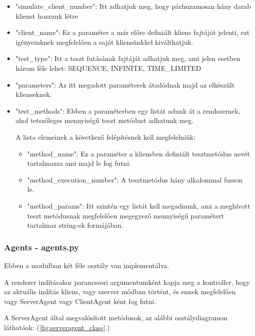 \documentclass[a4paper,12pt,oneside]{report}
\begin{document}
\begin{itemize}
    \itemsep0em
        \item "simulate\_client\_number": Itt adhatjuk meg, hogy párhuzamosan hány darab klienst hozzunk létre
        \item "client\_name": Ez a paraméter a már előre definiált kliens fajtáját jelenti, ezt igényeinknek megfelelően a saját kliensünkkel kiválthatjuk.
        \item "test\_type": Itt a teszt futásának fajtáját adhatjuk meg, ami jelen esetben három féle lehet: SEQUENCE, INFINITE, TIME\_LIMITED
        \item "parameters": Az itt megadott paraméterek átadódnak majd az elkészült klienseknek.
        \item "test\_methods": Ebben a paraméterben egy listát adunk át a rendszernek, ahol tetszőleges mennyiségű teszt metódust adhatunk meg.

        A lista elemeinek a következő felépítésnek kell megfelelniük:
        \begin{itemize}
            \itemsep0em
                \item "method\_name": Ez a paraméter a kliensben definiált tesztmetódus nevét tartalmazza ami majd le fog futni.
                \item "method\_execution\_number": A tesztmetódus hány alkalommal fusson le.
                \item "method\_params": Itt szintén egy listát kell megadnunk, ami a meghívott teszt metódusnak megfelelően megegyező mennyiségű paramétert tartalmaz string-ek formájában.
        \end{itemize}

\end{itemize}

\subsubsection{Agents - agents.py}

Ebben a modulban két féle osztály van implementálva.

A rendszer indításakor parancssori argumentumként kapja meg a kontroller, hogy az aktuális indítás kliens, vagy szerver módban történt, és ennek megfelelően vagy ServerAgent vagy ClientAgent ként fog futni.

A ServerAgent által megvalósított metódusok, az alábbi osztálydiagramon láthatóak: (\ref{fig:serveragent_class}.)
\end{document}
